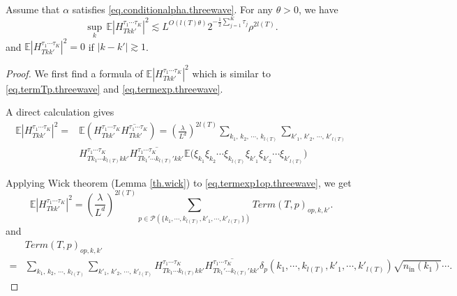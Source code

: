 \begin{prop}\label{prop.treetermsvarianceoperator}
Assume that $\alpha$ satisfies \eqref{eq.conditionalpha.threewave}. For any $\theta>0$, we have
\begin{equation}
    \sup_k\, \mathbb{E}|H^{\tau_1\cdots \tau_{K}}_{Tkk'}|^2\lesssim L^{O(l(T)\theta)} 2^{-\frac{1}{2}\sum_{j=1}^K \tau_{j}} \rho^{2l(T)}.
\end{equation}
and $\mathbb{E}|H^{\tau_1\cdots \tau_{K}}_{Tkk'}|^2=0$ if $|k-k'|\gtrsim 1$.
\end{prop}

\begin{proof} We first find a formula of $\mathbb{E}|H^{\tau_1\cdots \tau_{K}}_{Tkk'}|^2$ which is similar to \eqref{eq.termTp.threewave} and \eqref{eq.termexp.threewave}.

A direct calculation gives
\begin{equation}\label{eq.termexp1op.threewave}
\begin{split}
    \mathbb{E}|H^{\tau_1\cdots \tau_{K}}_{Tkk'}|^2=&\mathbb{E}(H^{\tau_1\cdots \tau_{K}}_{Tkk'}\overline{H^{\tau_1\cdots \tau_{K}}_{Tkk'}})=\left(\frac{\lambda}{L^{d}}\right)^{2l(T)}
    \sum_{k_1,\, k_2,\, \cdots,\, k_{l(T)}}\sum_{k'_1,\, k'_2,\, \cdots,\, k'_{l(T)}}
    \\[0.5em]
    & H^{\tau_1\cdots \tau_{K}}_{Tk_1\cdots k_{l(T)}kk'} \overline{H^{\tau_1\cdots \tau_{K}}_{Tk_1'\cdots k_{l(T)}'kk'}}  \mathbb{E}\Big(\xi_{k_1}\xi_{k_2}\cdots\xi_{k_{l(T)}}\xi_{k'_1}\xi_{k'_2}\cdots\xi_{k'_{l(T)}}\Big)
\end{split}
\end{equation}

Applying Wick theorem (Lemma \ref{th.wick}) to \eqref{eq.termexp1op.threewave}, we get
\begin{equation}\label{eq.termexpop.threewave}
\mathbb{E}|H^{\tau_1\cdots \tau_{K}}_{Tkk'}|^2=\left(\frac{\lambda}{L^{d}}\right)^{2l(T)}
    \sum_{p\in \mathcal{P}(\{k_1,\cdots, k_{l(T)}, k'_1,\cdots, k'_{l(T)}\})} Term(T, p)_{op,k,k
    '}.
\end{equation}
and
\begin{equation}\label{eq.termTpop.threewave}
\begin{split}
    &Term(T, p)_{op,k,k
    '}
    \\
    =&\sum_{k_1,\, k_2,\, \cdots,\, k_{l(T)}}\sum_{k'_1,\, k'_2,\, \cdots,\, k'_{l(T)}} H^{\tau_1\cdots \tau_{K}}_{Tk_1\cdots k_{l(T)}kk'} \overline{H^{\tau_1\cdots \tau_{K}}_{Tk_1'\cdots k_{l(T)}'kk'}} \delta_{p}(k_1,\cdots, k_{l(T)}, k'_1,\cdots, k'_{l(T)})\sqrt{n_{\textrm{in}}(k_1)}\cdots.
\end{split}
\end{equation}


\end{proof}
